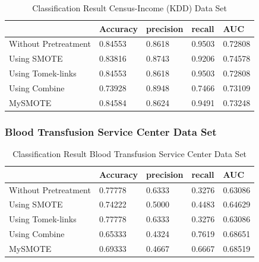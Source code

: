 \begin{table}[H]
    \caption{Classification Result Census-Income (KDD) Data Set}
    \centering
    \begin{tabular}{|l|l|l|l|l|}
    \hline
         & Accuracy & precision & recall & AUC \\ \hline
        Without Pretreatment & 0.84553 & 0.8618 & 0.9503 & 0.72808 \\ \hline
        Using SMOTE & 0.83816 & 0.8743 & 0.9206 & 0.74578 \\ \hline
        Using Tomek-links & 0.84553 & 0.8618 & 0.9503 & 0.72808 \\ \hline
        Using Combine & 0.73928 & 0.8948 & 0.7466 & 0.73109 \\ \hline
        MySMOTE & 0.84584 & 0.8624 & 0.9491 & 0.73248 \\ \hline
    \end{tabular}
\end{table}


\subsubsection{Blood Transfusion Service Center Data Set}

\begin{table}[H]
    \caption{Classification Result Blood Transfusion Service Center Data Set}
    \centering
    \begin{tabular}{|l|l|l|l|l|}
    \hline
         & Accuracy & precision & recall & AUC \\ \hline
        Without Pretreatment & 0.77778 & 0.6333 & 0.3276 & 0.63086 \\ \hline
        Using SMOTE & 0.74222 & 0.5000 & 0.4483 & 0.64629 \\ \hline
        Using Tomek-links & 0.77778 & 0.6333 & 0.3276 & 0.63086 \\ \hline
        Using Combine & 0.65333 & 0.4324 & 0.7619 & 0.68651 \\ \hline
        MySMOTE & 0.69333 & 0.4667 & 0.6667 & 0.68519 \\ \hline
    \end{tabular}
\end{table}
